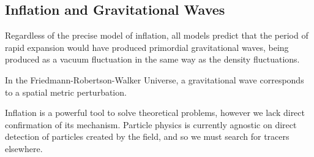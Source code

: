\subsection{Inflation and Gravitational Waves}
Regardless of the precise model of inflation, all models predict that the period of rapid expansion would have produced primordial gravitational waves, being produced as a vacuum fluctuation in the same way as the density fluctuations. 

\par In the Friedmann-Robertson-Walker Universe, a gravitational wave corresponds to a spatial metric perturbation. 


Inflation is a powerful tool to solve theoretical problems, however we lack direct confirmation of its mechanism. Particle physics is currently agnostic on direct detection of particles created by the field, and so we must search for tracers elsewhere. 






